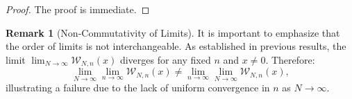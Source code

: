 \documentclass[reqno,11pt]{amsart}
\theoremstyle{definition}
\newtheorem{remark}[theorem]{{\bf Remark}}
\begin{document}
\begin{proof}
The proof is immediate.%
%
%
\end{proof}

\begin{remark}[Non-Commutativity of Limits]
It is important to emphasize that the order of limits is not interchangeable. As established in previous results, the limit $\lim_{N \to \infty} \mathcal{W}_{N, n}(x)$ diverges for any fixed $n$ and $x \neq 0$. Therefore:
\[
    \lim_{N \to \infty} \lim_{n \to \infty} \mathcal{W}_{N, n}(x) \neq \lim_{n \to \infty} \lim_{N \to \infty} \mathcal{W}_{N, n}(x),
\]
illustrating a failure due to the lack of uniform convergence in $n$ as $N \to \infty$.
\end{remark}
\end{document}
